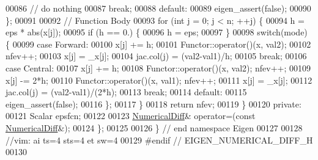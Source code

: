 \begin{DoxyCode}
00086                 \textcolor{comment}{// do nothing}
00087                 \textcolor{keywordflow}{break};
00088             \textcolor{keywordflow}{default}:
00089                 eigen\_assert(\textcolor{keyword}{false});
00090         \};
00091 
00092         \textcolor{comment}{// Function Body}
00093         \textcolor{keywordflow}{for} (\textcolor{keywordtype}{int} j = 0; j < n; ++j) \{
00094             h = eps * abs(x[j]);
00095             \textcolor{keywordflow}{if} (h == 0.) \{
00096                 h = eps;
00097             \}
00098             \textcolor{keywordflow}{switch}(mode) \{
00099                 \textcolor{keywordflow}{case} Forward:
00100                     x[j] += h;
00101                     Functor::operator()(x, val2);
00102                     nfev++;
00103                     x[j] = \_x[j];
00104                     jac.col(j) = (val2-val1)/h;
00105                     \textcolor{keywordflow}{break};
00106                 \textcolor{keywordflow}{case} Central:
00107                     x[j] += h;
00108                     Functor::operator()(x, val2); nfev++;
00109                     x[j] -= 2*h;
00110                     Functor::operator()(x, val1); nfev++;
00111                     x[j] = \_x[j];
00112                     jac.col(j) = (val2-val1)/(2*h);
00113                     \textcolor{keywordflow}{break};
00114                 \textcolor{keywordflow}{default}:
00115                     eigen\_assert(\textcolor{keyword}{false});
00116             \};
00117         \}
00118         \textcolor{keywordflow}{return} nfev;
00119     \}
00120 \textcolor{keyword}{private}:
00121     Scalar epsfcn;
00122 
00123     \hyperlink{class_eigen_1_1_numerical_diff}{NumericalDiff}& operator=(\textcolor{keyword}{const} \hyperlink{class_eigen_1_1_numerical_diff}{NumericalDiff}&);
00124 \};
00125 
00126 \} \textcolor{comment}{// end namespace Eigen}
00127 
00128 \textcolor{comment}{//vim: ai ts=4 sts=4 et sw=4}
00129 \textcolor{preprocessor}{#endif // EIGEN\_NUMERICAL\_DIFF\_H}
00130 
\end{DoxyCode}
